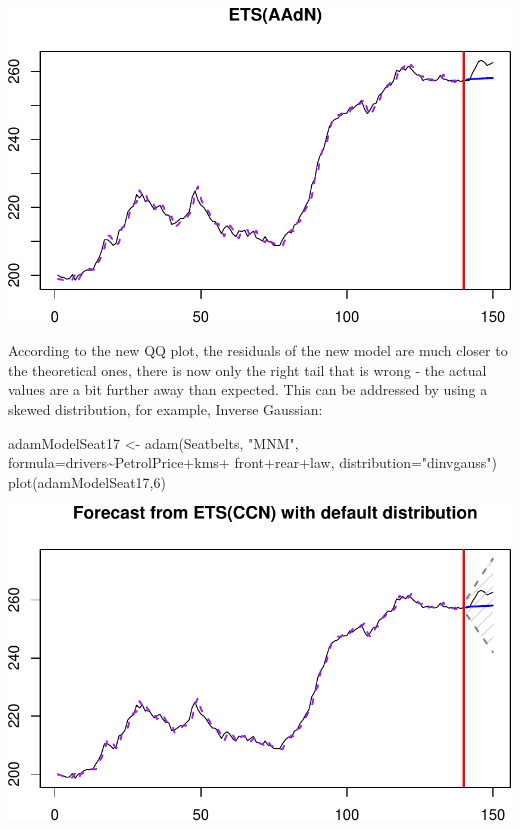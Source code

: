 \documentclass[
]{book}
\newenvironment{Shaded}{\begin{snugshade}}{\end{snugshade}}
\newcommand{\AttributeTok}[1]{\textcolor[rgb]{0.77,0.63,0.00}{#1}}
\newcommand{\DecValTok}[1]{\textcolor[rgb]{0.00,0.00,0.81}{#1}}
\newcommand{\FunctionTok}[1]{\textcolor[rgb]{0.00,0.00,0.00}{#1}}
\newcommand{\NormalTok}[1]{#1}
\newcommand{\OtherTok}[1]{\textcolor[rgb]{0.56,0.35,0.01}{#1}}
\newcommand{\SpecialCharTok}[1]{\textcolor[rgb]{0.00,0.00,0.00}{#1}}
\newcommand{\StringTok}[1]{\textcolor[rgb]{0.31,0.60,0.02}{#1}}
\theoremstyle{definition}
\theoremstyle{definition}
\theoremstyle{definition}
\theoremstyle{definition}
\theoremstyle{remark}
\begin{document}
\includegraphics{adam_files/figure-latex/unnamed-chunk-168-1.pdf}

According to the new QQ plot, the residuals of the new model are much closer to the theoretical ones, there is now only the right tail that is wrong - the actual values are a bit further away than expected. This can be addressed by using a skewed distribution, for example, Inverse Gaussian:

\begin{Shaded}
\begin{Highlighting}[]
\NormalTok{adamModelSeat17 }\OtherTok{\textless{}{-}} \FunctionTok{adam}\NormalTok{(Seatbelts, }\StringTok{"MNM"}\NormalTok{,}
                        \AttributeTok{formula=}\NormalTok{drivers}\SpecialCharTok{\textasciitilde{}}\NormalTok{PetrolPrice}\SpecialCharTok{+}\NormalTok{kms}\SpecialCharTok{+}
\NormalTok{                          front}\SpecialCharTok{+}\NormalTok{rear}\SpecialCharTok{+}\NormalTok{law,}
                        \AttributeTok{distribution=}\StringTok{"dinvgauss"}\NormalTok{)}
\FunctionTok{plot}\NormalTok{(adamModelSeat17,}\DecValTok{6}\NormalTok{)}
\end{Highlighting}
\end{Shaded}

\includegraphics{adam_files/figure-latex/unnamed-chunk-169-1.pdf}
\end{document}

